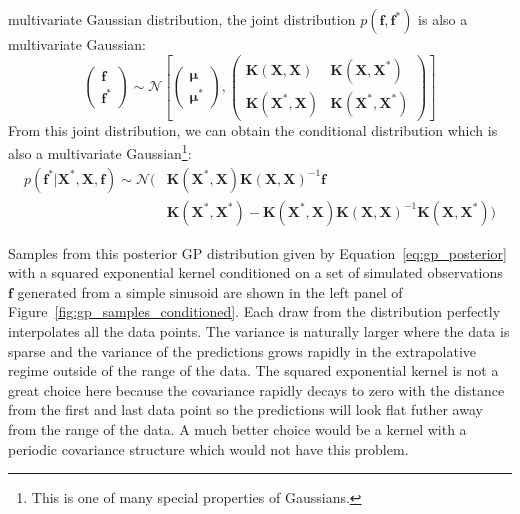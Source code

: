 \documentclass[12pt,dvipsnames]{report}
\renewcommand{\vec}[1]{\boldsymbol{\mathbf{#1}}}
\begin{document}
multivariate Gaussian distribution, the joint distribution $p(\vec{f},
    \vec{f}^*)$ is also a multivariate Gaussian:
\begin{equation}
    \begin{pmatrix}
        \vec{f} \\
        \vec{f}^*
    \end{pmatrix} \sim \mathcal{N}\left[\begin{pmatrix}
            \vec{\mu} \\
            \vec{\mu}^*
        \end{pmatrix},\begin{pmatrix}
            \vec K(\vec{X},\vec{X})    & \vec K(\vec{X},\vec{X}^*)   \\
            \vec K(\vec{X}^*, \vec{X}) & \vec K(\vec{X}^*,\vec{X}^*)
        \end{pmatrix}\right]
\end{equation}
From this joint distribution, we can obtain the conditional  distribution
\citep[see appendix A2 in ][]{rasmussen2006} which is also a multivariate Gaussian\footnote{
    This is one of many special properties of Gaussians.
}:
\begin{align}
    p(\mathbf{f}^{*} \lvert \vec X^{*}, \vec X, \mathbf{f} )\sim \mathcal{N}( & \vec K\left(\vec X^*, \vec X\right) \vec K(\vec X, \vec X)^{-1} \mathbf{f}                                                          \\
                                                                              & \vec K\left(\vec X^*, \vec X^*\right)  -\vec K\left(\vec X^*, \vec X \right) \vec K(\vec X, \vec X)^{-1} \vec K (\vec X, \vec X^*))
    \label{eq:gp_posterior}
\end{align}

Samples from this posterior GP distribution given by
Equation~\ref{eq:gp_posterior} with a squared exponential kernel conditioned on
a set of simulated observations $\vec{f}$ generated from a simple sinusoid are
shown in the left panel of Figure~\ref{fig:gp_samples_conditioned}. Each draw
from the distribution perfectly interpolates all the data points. The variance
is naturally larger where the data is sparse and the variance of the
predictions grows rapidly in the extrapolative regime outside of the range of
the data. The squared exponential kernel is not a great choice here because the
covariance rapidly decays to zero with the distance from the first and last
data point so the predictions will look flat futher away from the range of the
data. A much better choice would be a kernel with a periodic covariance
structure which would not have this problem.
\end{document}

